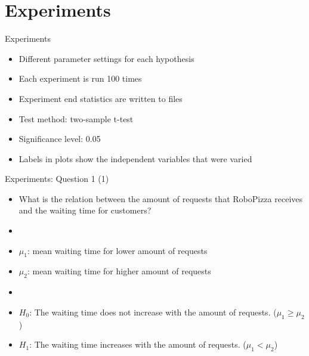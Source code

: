 \section{Experiments}

\begin{frame}{Experiments}
    \begin{itemize}
        \item Different parameter settings for each hypothesis
        \item Each experiment is run 100 times
        \item Experiment end statistics are written to files
        \item Test method: two-sample t-test %
        \item Significance level: 0.05
        \item Labels in plots show the independent variables that were varied
    \end{itemize}
\end{frame}


\begin{frame}{Experiments: Question 1 (1)}
    \begin{itemize}
        \item What is the relation between the amount of requests that RoboPizza receives and the waiting time for customers?
        \item[]
        \item $\mu_1$: mean waiting time for lower amount of requests
        \item $\mu_2$: mean waiting time for higher amount of requests
        \item[]
        \item $H_0$: The waiting time does not increase with the amount of requests. ($\mu_1 \geq \mu_2$)
        \item $H_1$: The waiting time increases with the amount of requests. ($\mu_1 < \mu_2$)
    \end{itemize}
\end{frame}

